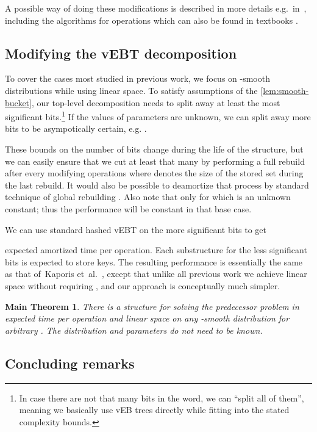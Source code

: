 \documentclass[
submission
, nomarks
]{dmtcs-episciences}
\theoremstyle{plain}
\theoremstyle{definition}
\theoremstyle{remark}
\theoremstyle{plain}
\theoremstyle{plain}
\newtheorem*{thm*}{Main Theorem}
\begin{document}
A possible way of doing these modifications is described in more details
e.g.~in~\cite[chapter 4]{Cunat10}, including the algorithms for
operations which can also be found in textbooks \cite[chapter 20]{intro2alg}.

\subsection{Modifying the vEBT decomposition}

To cover the cases most studied in previous work, we focus on
-smooth distributions while using linear space.
To satisfy assumptions of the \ref{lem:smooth-bucket}, our top-level decomposition
needs to split away at least the most significant
 bits.\footnote{In case there are not that many bits in the word, we can ``split
all of them'', meaning we basically use vEB trees directly while
fitting into the stated complexity bounds.} If the values of parameters are unknown, we can split away more bits
to be asympotically certain, e.g. .

These bounds on the number of bits change during the life of the structure,
but we can easily ensure that we cut at least that many by performing
a full rebuild after every  modifying operations where 
denotes the size of the stored set during the last rebuild. It would
also be possible to deamortize that process by standard technique
of global rebuilding \cite{global-rebuilding}. Also note that 
only for  which is an unknown constant; thus
the performance will be constant in that base case.

We can use standard hashed vEBT on the more significant bits to get

expected amortized time per operation. Each substructure for the less
significant bits is expected to store  keys. The resulting
performance is essentially the same as that of~Kaporis et~al.~\cite{KMSTTZ06},
except that unlike all previous work we achieve linear space without
requiring , and our approach is conceptually much simpler.
\begin{thm*}There is a structure for solving the predecessor problem in 
expected time per operation and linear space on any -smooth
distribution for arbitrary . The distribution and
parameters do not need to be known.
\end{thm*}



\subsection{Concluding remarks}
\end{document}
